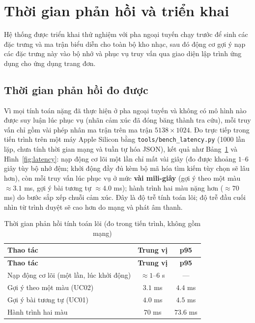 \documentclass[../DoAn.tex]{subfiles}
\begin{document}
\section{Thời gian phản hồi và triển khai}
\label{section:deploy}
Hệ thống được triển khai thử nghiệm với pha ngoại tuyến chạy trước để sinh các đặc trưng và ma trận biểu diễn cho toàn bộ kho nhạc, sau đó động cơ gợi ý nạp các đặc trưng này vào bộ nhớ và phục vụ truy vấn qua giao diện lập trình ứng dụng cho ứng dụng trang đơn.

\subsection{Thời gian phản hồi đo được}
\label{subsec:latency}
Vì mọi tính toán nặng đã thực hiện ở pha ngoại tuyến và không có mô hình nào được suy luận lúc phục vụ (nhãn cảm xúc đã đóng băng thành tra cứu), mỗi truy vấn chỉ gồm vài phép nhân ma trận trên ma trận $5138 \times 1024$. Đo trực tiếp trong tiến trình trên một máy Apple Silicon bằng \texttt{tools/bench\_latency.py} (1000 lần lặp, chưa tính thời gian mạng và tuần tự hóa JSON), kết quả như Bảng~\ref{table:latency} và Hình~\ref{fig:latency}: nạp động cơ lõi một lần chỉ mất vài giây (đo được khoảng $1$--$6$ giây tùy bộ nhớ đệm; khởi động đầy đủ kèm bộ mã hóa tìm kiếm tùy chọn sẽ lâu hơn), còn mỗi truy vấn lúc phục vụ ở mức \textbf{vài mili-giây} (gợi ý theo một màu $\approx 3.1$ ms, gợi ý bài tương tự $\approx 4.0$ ms); hành trình hai màu nặng hơn ($\approx 70$ ms) do bước sắp xếp chuỗi cảm xúc. Đây là độ trễ tính toán lõi; độ trễ đầu cuối nhìn từ trình duyệt sẽ cao hơn do mạng và phát âm thanh.

\begin{longtable}{|p{6.6cm}|c|c|}
\caption{Thời gian phản hồi tính toán lõi (đo trong tiến trình, không gồm mạng)}\label{table:latency}\\
\hline
\textbf{Thao tác} & \textbf{Trung vị} & \textbf{p95} \\
\hline
\endfirsthead
\hline
\textbf{Thao tác} & \textbf{Trung vị} & \textbf{p95} \\
\hline
\endhead
Nạp động cơ lõi (một lần, lúc khởi động) & $\approx 1$--$6$ s & --- \\
\hline
Gợi ý theo một màu (UC02) & $3.1$ ms & $4.4$ ms \\
\hline
Gợi ý bài tương tự (UC01) & $4.0$ ms & $4.5$ ms \\
\hline
Hành trình hai màu & $70$ ms & $73.6$ ms \\
\hline
\end{longtable}
\end{document}
